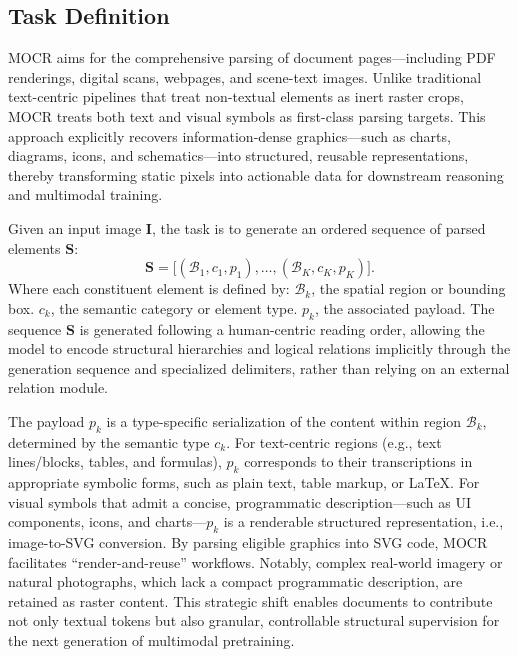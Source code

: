 \documentclass{article}
\begin{document}
\subsection{Task Definition}
\label{sec:task_definition}
        MOCR aims for the comprehensive parsing of document pages—including PDF renderings, digital scans, webpages, and scene-text images. Unlike traditional text-centric pipelines that treat non-textual elements as inert raster crops, MOCR treats both text and visual symbols as first-class parsing targets. This approach explicitly recovers information-dense graphics—such as charts, diagrams, icons, and schematics—into structured, reusable representations, thereby transforming static pixels into actionable data for downstream reasoning and multimodal training.
    
    Given an input image $\mathbf{I}$, the task is to generate an ordered sequence of parsed elements $\mathbf{S}$:
        \begin{equation}
        \mathbf{S} = \big[(\mathcal{B}_1, c_1, p_1), \ldots, (\mathcal{B}_K, c_K, p_K)\big].
        \end{equation}
    Where each constituent element is defined by:
    $\mathcal{B}_k$, the spatial region or bounding box. $c_k$, the semantic category or element type. $p_k$, the associated payload. The sequence $\mathbf{S}$ is generated following a human-centric reading order, allowing the model to encode structural hierarchies and logical relations implicitly through the generation sequence and specialized delimiters, rather than relying on an external relation module.
    
    The payload $p_k$ is a type-specific serialization of the content within region $\mathcal{B}_k$, determined by the semantic type $c_k$.
    For text-centric regions (e.g., text lines/blocks, tables, and formulas), $p_k$ corresponds to their transcriptions in appropriate symbolic forms, such as plain text, table markup, or \LaTeX{}. For visual symbols that admit a concise, programmatic description—such as UI components, icons, and charts—$p_k$ is a renderable structured representation, i.e., image-to-SVG conversion. By parsing eligible graphics into SVG code, MOCR facilitates ``render-and-reuse'' workflows. Notably, complex real-world imagery or natural photographs, which lack a compact programmatic description, are retained as raster content. This strategic shift enables documents to contribute not only textual tokens but also granular, controllable structural supervision for the next generation of multimodal pretraining.
\end{document}
